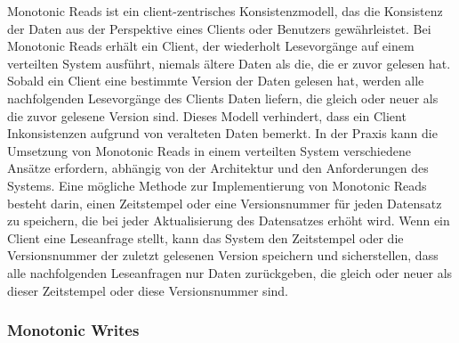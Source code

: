 \documentclass[../vs-script-first-v01.tex]{subfiles}
\begin{document}
Monotonic Reads ist ein client-zentrisches Konsistenzmodell, das die Konsistenz der Daten aus der Perspektive eines Clients oder Benutzers gewährleistet. Bei Monotonic Reads erhält ein Client, der wiederholt Lesevorgänge auf einem verteilten System ausführt, niemals ältere Daten als die, die er zuvor gelesen hat. Sobald ein Client eine bestimmte Version der Daten gelesen hat, werden alle nachfolgenden Lesevorgänge des Clients Daten liefern, die gleich oder neuer als die zuvor gelesene Version sind. Dieses Modell verhindert, dass ein Client Inkonsistenzen aufgrund von veralteten Daten bemerkt.
In der Praxis kann die Umsetzung von Monotonic Reads in einem verteilten System verschiedene Ansätze erfordern, abhängig von der Architektur und den Anforderungen des Systems. Eine mögliche Methode zur Implementierung von Monotonic Reads besteht darin, einen Zeitstempel oder eine Versionsnummer für jeden Datensatz zu speichern, die bei jeder Aktualisierung des Datensatzes erhöht wird. Wenn ein Client eine Leseanfrage stellt, kann das System den Zeitstempel oder die Versionsnummer der zuletzt gelesenen Version speichern und sicherstellen, dass alle nachfolgenden Leseanfragen nur Daten zurückgeben, die gleich oder neuer als dieser Zeitstempel oder diese Versionsnummer sind.
\subsubsection{Monotonic Writes}
\end{document}
